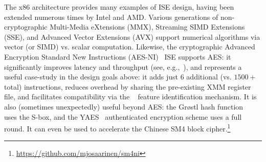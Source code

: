 \noindent
The x86 architecture provides many examples of ISE design,
having been extended numerous times by Intel and AMD.
Various generations of
non-cryptographic
Multi-Media      eXtensions (MMX),
Streaming SIMD  Extensions (SSE),
and
Advanced Vector Extensions (AVX)
support numerical algorithms via vector (or SIMD) vs. scalar computation.  
Likewise, the
    cryptographic
Advanced Encryption Standard New Instructions (AES-NI)~\cite{Gueron:09,DruGueKra:19}
ISE
supports AES: it significantly improves latency and throughput
(see, e.g.,~\cite{FazLopOli:18}),
and represents a useful case-study in the design goals above:
it adds just $6$ additional (vs. $1500+$ total) instructions,
reduces overhead by sharing the pre-existing XMM register file,
and facilitates compatibility via the
~\cite[Chapter 20]{X86:1:18}
feature identification mechanism.
It is also (sometimes unexpectedly) useful beyond AES:
the Gr{\o}stl hash function ~\cite{GKMMRST:11} uses the S-box,
and
the YAES~\cite{BosVer:14} authenticated encryption scheme uses a full round.
It can even be used to accelerate the Chinese SM4 block cipher.\footnote{\url{https://github.com/mjosaarinen/sm4ni}}

